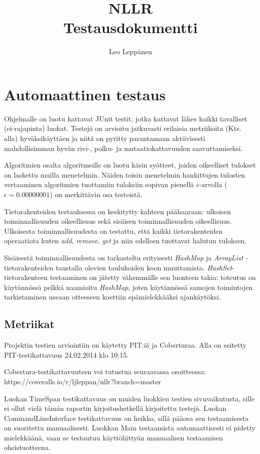 \documentclass[12pt,a4paper]{article}
\author{Leo Leppänen}
\title{NLLR \\ Testausdokumentti}
\begin{document}
\maketitle

\section{Automaattinen testaus}

Ohjelmalle on luotu kattavat JUnit testit, jotka kattavat lähes kaikki tavalliset (ei-rajapinta) luokat. Testejä on arvioitu jatkuvasti erilaisia metriikoita (Kts. alla) hyväksikäyttäen ja niitä on pyritty parantamaan aktiivisesti mahdollisimman hyvän rivi-, polku- ja mutaatiokattavuuden saavuttamiseksi.

Algoritmien osalta algoritmeille on luotu käsin syötteet, joiden oikeelliset tulokset on laskettu muilla menetelmin. Näiden toisin menetelmin hankittujen tulosten vertaaminen algoritmien tuottamiin tuloksiin sopivan pienellä $\epsilon$-arvolla ($\epsilon = 0.00000001$)  on merkittävin osa testeistä.

Tietorakenteiden testauksessa on keskitytty kahteen päähaaraan: ulkoisen toiminnallisuuden oikeellisuus sekä sisäisen toiminnallisuuden oikeellisuus. Ulkoisesta toiminnallisuudesta on testattu, että kaikki tietorakenteiden operaatiota kuten \textit{add}, \textit{remove}, \textit{get} ja niin edelleen tuottavat halutun tuloksen. 

Sisäisestä toiminnallisuudesta on tarkasteltu erityisesti \textit{HashMap} ja \textit{ArrayList} -tietorakenteiden taustalla olevien taulukoiden koon muuttamista. \textit{HashSet}-tietorakenteen testaaminen on jätetty vähemmälle sen luonteen takia: toteutus on käytännössä pelkkä naamioitu \textit{HashMap}, joten käytännössä samojen toimintojen tarkistaminen useaan otteeseen koettiin epämielekkääksi ajankäytöksi.

\subsection{Metriikat}
Projektin testien arviointiin on käytetty PIT:iä ja Coberturaa. Alla on esitetty PIT-testikattavuus 24.02.2014 klo 10:15. 

Cobertura-testikattavuuteen voi tutustua seuraavassa osoitteessa: https://coveralls.io/r/ljleppan/nllr?branch=master

Luokan TimeSpan testikattavuus on muiden luokkien testien sivuvaikutusta, sille ei ollut vielä tämän raportin kirjoitushetkellä kirjoitettu testejä. Luokan CommandLineInterface testikattavuus on heikko, sillä pääosa sen testaamisesta on suoritettu manuaalisesti. Luokkan Main testaamista automaattisesti ei pidetty mielekkäänä, vaan se testautuu käyttöliittyän manuaalisen testaamisen oheistuotteena.
\end{document}
